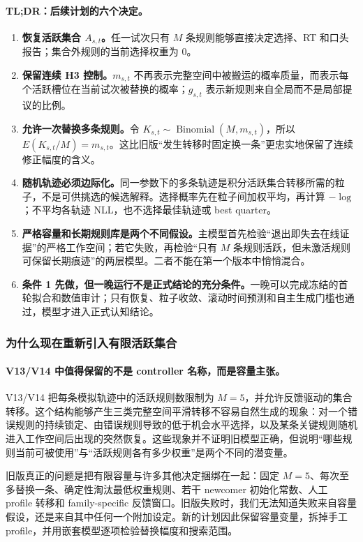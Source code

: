 \paragraph{TL;DR：后续计划的六个决定。}
\begin{enumerate}
    \item \textbf{恢复活跃集合 $A_{s,t}$。}任一试次只有 $M$ 条规则能够直接决定选择、RT 和口头报告；集合外规则的当前选择权重为 0。
    \item \textbf{保留连续 H3 控制。}$m_{s,t}$ 不再表示完整空间中被搬运的概率质量，而表示每个活跃槽位在当前试次被替换的概率；$g_{s,t}$ 表示新规则来自全局而不是局部提议的比例。
    \item \textbf{允许一次替换多条规则。}令 $K_{s,t}\sim\operatorname{Binomial}(M,m_{s,t})$，所以 $E(K_{s,t}/M)=m_{s,t}$。这比旧版“发生转移时固定换一条”更忠实地保留了连续修正幅度的含义。
    \item \textbf{随机轨迹必须边际化。}同一参数下的多条轨迹是积分活跃集合转移所需的粒子，不是可供挑选的候选解释。选择概率先在粒子间加权平均，再计算 $-\log$；不平均各轨迹 NLL，也不选择最佳轨迹或 best quarter。
    \item \textbf{严格容量和长期规则库是两个不同假设。}主模型首先检验“退出即失去在线证据”的严格工作空间；若它失败，再检验“只有 $M$ 条规则活跃，但未激活规则可保留长期痕迹”的两层模型。二者不能在第一个版本中悄悄混合。
    \item \textbf{条件 1 先做，但一晚运行不是正式结论的充分条件。}一晚可以完成冻结的首轮拟合和数值审计；只有恢复、粒子收敛、滚动时间预测和自主生成门槛也通过，模型才进入正式认知结论。
\end{enumerate}


\subsubsection{为什么现在重新引入有限活跃集合}

\paragraph{V13/V14 中值得保留的不是 controller 名称，而是容量主张。}
V13/V14 把每条模拟轨迹中的活跃规则数限制为 $M=5$，并允许反馈驱动的集合转移。这个结构能够产生三类完整空间平滑转移不容易自然生成的现象：对一个错误规则的持续锁定、由错误规则导致的低于机会水平选择，以及某条关键规则随机进入工作空间后出现的突然恢复。这些现象并不证明旧模型正确，但说明“哪些规则当前可被使用”与“活跃规则各有多少权重”是两个不同的潜变量。

旧版真正的问题是把有限容量与许多其他决定捆绑在一起：固定 $M=5$、每次至多替换一条、确定性淘汰最低权重规则、若干 newcomer 初始化常数、人工 profile 转移和 family-specific 反馈窗口。旧版失败时，我们无法知道失败来自容量假设，还是来自其中任何一个附加设定。新的计划因此保留容量变量，拆掉手工 profile，并用嵌套模型逐项检验替换幅度和搜索范围。

